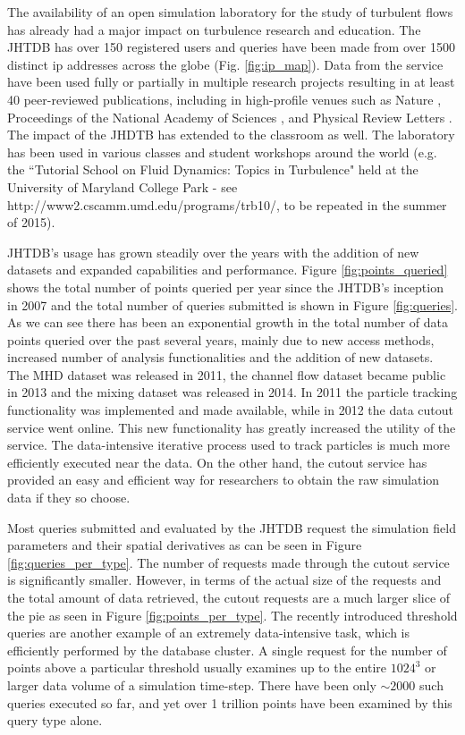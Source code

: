 \documentclass[10pt,twocolumn]{article}
\begin{document}
The availability of an open simulation laboratory for the study of turbulent flows has already had a major impact on turbulence research and education. 
The JHTDB has over 150 registered users and queries have been made from over 1500 distinct ip addresses across the globe (Fig. \ref{fig:ip_map}).
Data from the service have been used fully or partially in multiple research projects resulting in at least 40 peer-reviewed publications, including in
high-profile venues such as Nature \cite{Eyink}, Proceedings of the National Academy of Sciences \cite{xu2014flight}, 
and Physical Review Letters \cite{jucha2014time}. 
The impact of the JHDTB has extended to the classroom as well. The laboratory has been used in various classes and student workshops 
around the world (e.g. the ``Tutorial School on Fluid Dynamics: Topics in Turbulence" held at the University of Maryland College Park - 
see http://www2.cscamm.umd.edu/programs/trb10/, to be repeated in the summer of 2015).

JHTDB's usage has grown steadily over the years with the addition of new datasets and expanded capabilities and performance. Figure \ref{fig:points_queried}
shows the total number of points queried per year since the JHTDB's inception in 2007 and the total number of queries submitted is shown in Figure
\ref{fig:queries}. As we can see there has been an exponential growth in the total number of data points queried over the past several years, mainly due to
new access methods, increased number of analysis functionalities and the addition of new datasets. 
The MHD dataset was released in 2011, the channel flow dataset
became public in 2013 and the mixing dataset was released in 2014. In 2011 the particle tracking functionality was implemented and made available, while
in 2012 the data cutout service went online. This new functionality has greatly increased the utility of the service. The data-intensive iterative process used to
track particles is much more efficiently executed near the data. On the other hand, the cutout service has provided an easy and efficient way for researchers to
obtain the raw simulation data if they so choose. 

Most queries submitted and evaluated by the JHTDB request the simulation field parameters and their spatial derivatives as can be seen in Figure
\ref{fig:queries_per_type}. The number of requests made through the cutout service is significantly smaller. However, in terms of the actual size of the requests
and the total amount of data retrieved, the cutout requests are a much larger slice of the pie as seen in Figure \ref{fig:points_per_type}. The recently introduced
threshold queries are another example of an extremely data-intensive task, which is efficiently performed by the database cluster. A single request for the 
number of points above a particular threshold usually examines up to the entire $1024^3$ or larger data volume of a simulation time-step. 
There have been only $\sim2000$ such queries executed so far, and yet over 1 trillion points have been examined by this query type alone.
\end{document}
